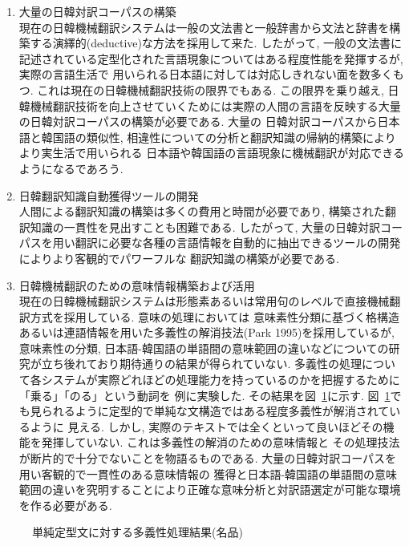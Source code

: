 \begin{enumerate}
\item
大量の日韓対訳コーパスの構築 \\
 現在の日韓機械翻訳システムは一般の文法書と一般辞書から文法と辞書を構築する演繹的(deductive)な方法を採用して来た. 
したがって, 一般の文法書に記述されている定型化された言語現象についてはある程度性能を発揮するが, 実際の言語生活で
用いられる日本語に対しては対応しきれない面を数多くもつ. これは現在の日韓機械翻訳技術の限界でもある. この限界を乗り越え, 
日韓機械翻訳技術を向上させていくためには実際の人間の言語を反映する大量の日韓対訳コーパスの構築が必要である. 大量の
日韓対訳コーパスから日本語と韓国語の類似性, 相違性についての分析と翻訳知識の帰納的構築によりより実生活で用いられる
日本語や韓国語の言語現象に機械翻訳が対応できるようになるであろう. 
\item
日韓翻訳知識自動獲得ツールの開発 \\
 人間による翻訳知識の構築は多くの費用と時間が必要であり, 構築された翻訳知識の一貫性を見出すことも困難である. したがって, 
大量の日韓対訳コーパスを用い翻訳に必要な各種の言語情報を自動的に抽出できるツールの開発によりより客観的でパワーフルな
翻訳知識の構築が必要である. 
\item
日韓機械翻訳のための意味情報構築および活用 \\
 現在の日韓機械翻訳システムは形態素あるいは常用句のレベルで直接機械翻訳方式を採用している. 意味の処理においては
意味素性分類に基づく格構造あるいは連語情報を用いた多義性の解消技法(Park 1995)を採用しているが, 意味素性の分類, 
日本語-韓国語の単語間の意味範囲の違いなどについての研究が立ち後れており期待通りの結果が得られていない. 
多義性の処理について各システムが実際どれほどの処理能力を持っているのかを把握するために「乗る」「のる」という動詞を
例に実験した. その結果を図~\ref{seman}に示す. 図~\ref{seman}でも見られるように定型的で単純な文構造ではある程度多義性が解消されているように
見える. しかし, 実際のテキストでは全くといって良いほどその機能を発揮していない. これは多義性の解消のための意味情報と
その処理技法が断片的で十分でないことを物語るものである. 大量の日韓対訳コーパスを用い客観的で一貫性のある意味情報の
獲得と日本語-韓国語の単語間の意味範囲の違いを究明することにより正確な意味分析と対訳語選定が可能な環境を作る必要がある. 
\end{enumerate}

\begin{figure}
\begin{center}
\caption{\label{seman}単純定型文に対する多義性処理結果(名品)}
\end{center}
\end{figure}



